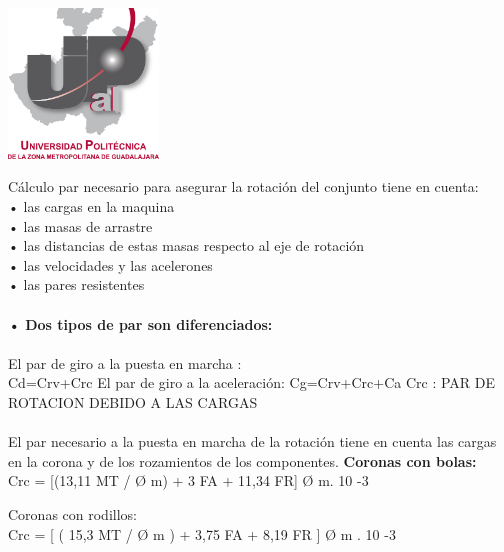 \documentclass[10pt,a4paper]{article}
\begin{document}
\begin{center}
\includegraphics[width=0.3\textwidth]{upzmg.png}\\
\end{center}\cite{joseph2018kick}
Cálculo par necesario para asegurar la rotación del conjunto tiene en cuenta:\\
  • las cargas en la maquina\\
   • las masas de arrastre\\
   • las distancias de estas masas respecto al eje de rotación\\
   • las velocidades y las acelerones\\
   • las pares resistentes\\ \\\textbf{•}
   \textbf{Dos tipos de par son diferenciados:}\\  \\
   El par de giro a la puesta en marcha :\\ Cd=Crv+Crc
   El par de giro a la aceleración: Cg=Crv+Crc+Ca
   Crc : PAR DE ROTACION DEBIDO A LAS CARGAS\\ \\
 El par necesario a la puesta en marcha de la rotación tiene en cuenta las cargas en la corona y de los rozamientos de los componentes.
\textbf{Coronas con bolas:}\\
Crc = [(13,11 MT / Ø m) + 3 FA + 11,34 FR] Ø m. 10 -3

Coronas con rodillos:\\
Crc = [ ( 15,3 MT / Ø m ) + 3,75 FA + 8,19 FR ] Ø m . 10 -3\\
\end{document}
